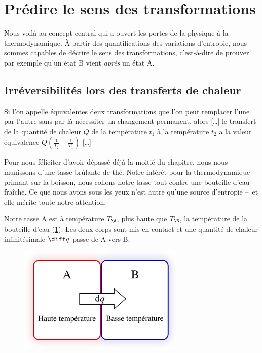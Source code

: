 \section{Prédire le sens des transformations}

	Nous voilà au concept central qui a ouvert les portes de la physique à la thermodynamique. À partir des quantifications des variations d’entropie, nous sommes capables de décrire le sens des transformations, c’est-à-dire de prouver par exemple qu’un état B vient \emph{après} un état A.

	\subsection{Irréversibilités lors des transferts de chaleur}

			Si l’on appelle équivalentes deux transformations que l’on peut remplacer l’une par l’autre sans par là nécessiter un changement permanent, alors […] le transfert de la quantité de chaleur $Q$ de la température $t_1$ à la température $t_2$ a la valeur équivalence $Q \left( \frac{1}{T_2} - \frac{1}{T_1}\right)$ […]
		
		Pour nous féliciter d’avoir dépassé déjà la moitié du chapitre, nous nous munissons d’une tasse brûlante de thé. Notre intérêt pour la thermodynamique primant sur la boisson, nous collons notre tasse tout contre une bouteille d’eau fraîche. Ce que nous avons sous les yeux n’est autre qu’une source d’entropie --\ et elle mérite toute notre attention.

		Notre tasse A est à température $T_\A$, plus haute que $T_\B$, la température de la bouteille d’eau (\cref{fig_expérience_création_entropie}). Les deux corps sont mis en contact et une quantité de chaleur infinitésimale $\diff q$ passe de A vers B.

		\begin{figure}
			\begin{center}
				\includegraphics[width=8cm]{images/transfert_chaleur_irreversible.png}
			\end{center}
			\label{fig_expérience_création_entropie}
		\end{figure}


